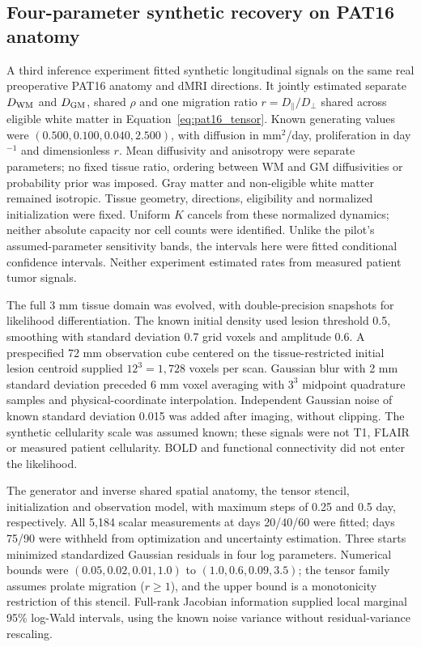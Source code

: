 \subsection{Four-parameter synthetic recovery on PAT16 anatomy}\label{sec:pat16_recovery_methods}
A third inference experiment fitted synthetic longitudinal signals on the same real preoperative PAT16 anatomy and dMRI directions. It jointly estimated separate $D_{\rm WM}$ and $D_{\rm GM}$, shared $\rho$ and one migration ratio $r=D_\parallel/D_\perp$ shared across eligible white matter in Equation~\eqref{eq:pat16_tensor}. Known generating values were $(0.500,0.100,0.040,2.500)$, with diffusion in mm$^2$/day, proliferation in day$^{-1}$ and dimensionless $r$. Mean diffusivity and anisotropy were separate parameters; no fixed tissue ratio, ordering between WM and GM diffusivities or probability prior was imposed. Gray matter and non-eligible white matter remained isotropic. Tissue geometry, directions, eligibility and normalized initialization were fixed. Uniform $K$ cancels from these normalized dynamics; neither absolute capacity nor cell counts were identified. Unlike the pilot's assumed-parameter sensitivity bands, the intervals here were fitted conditional confidence intervals. Neither experiment estimated rates from measured patient tumor signals.

The full 3 mm tissue domain was evolved, with double-precision snapshots for likelihood differentiation. The known initial density used lesion threshold 0.5, smoothing with standard deviation 0.7 grid voxels and amplitude 0.6. A prespecified 72 mm observation cube centered on the tissue-restricted initial lesion centroid supplied $12^3=1{,}728$ voxels per scan. Gaussian blur with 2 mm standard deviation preceded 6 mm voxel averaging with $3^3$ midpoint quadrature samples and physical-coordinate interpolation. Independent Gaussian noise of known standard deviation 0.015 was added after imaging, without clipping. The synthetic cellularity scale was assumed known; these signals were not T1, FLAIR or measured patient cellularity. BOLD and functional connectivity did not enter the likelihood.

The generator and inverse shared spatial anatomy, the tensor stencil, initialization and observation model, with maximum steps of 0.25 and 0.5 day, respectively. All 5,184 scalar measurements at days 20/40/60 were fitted; days 75/90 were withheld from optimization and uncertainty estimation. Three starts minimized standardized Gaussian residuals in four log parameters. Numerical bounds were $(0.05,0.02,0.01,1.0)$ to $(1.0,0.6,0.09,3.5)$; the tensor family assumes prolate migration ($r\geq1$), and the upper bound is a monotonicity restriction of this stencil. Full-rank Jacobian information supplied local marginal 95\% log-Wald intervals, using the known noise variance without residual-variance rescaling.

